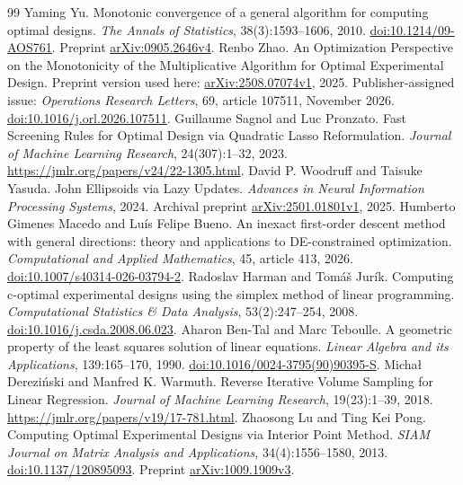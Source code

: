 \begin{thebibliography}{99}
 Yaming Yu. Monotonic convergence of a general algorithm for computing optimal designs. \emph{The Annals of Statistics}, 38(3):1593--1606, 2010. \href{https://doi.org/10.1214/09-AOS761}{doi:10.1214/09-AOS761}. Preprint \href{https://arxiv.org/abs/0905.2646v4}{arXiv:0905.2646v4}.
 Renbo Zhao. An Optimization Perspective on the Monotonicity of the Multiplicative Algorithm for Optimal Experimental Design. Preprint version used here: \href{https://arxiv.org/abs/2508.07074v1}{arXiv:2508.07074v1}, 2025. Publisher-assigned issue: \emph{Operations Research Letters}, 69, article 107511, November 2026. \href{https://doi.org/10.1016/j.orl.2026.107511}{doi:10.1016/j.orl.2026.107511}.
 Guillaume Sagnol and Luc Pronzato. Fast Screening Rules for Optimal Design via Quadratic Lasso Reformulation. \emph{Journal of Machine Learning Research}, 24(307):1--32, 2023. \url{https://jmlr.org/papers/v24/22-1305.html}.
 David P. Woodruff and Taisuke Yasuda. John Ellipsoids via Lazy Updates. \emph{Advances in Neural Information Processing Systems}, 2024. Archival preprint \href{https://arxiv.org/abs/2501.01801v1}{arXiv:2501.01801v1}, 2025.
 Humberto Gimenes Macedo and Lu\'is Felipe Bueno. An inexact first-order descent method with general directions: theory and applications to DE-constrained optimization. \emph{Computational and Applied Mathematics}, 45, article 413, 2026. \href{https://doi.org/10.1007/s40314-026-03794-2}{doi:10.1007/s40314-026-03794-2}.
 Radoslav Harman and Tom\'a\v{s} Jur\'ik. Computing c-optimal experimental designs using the simplex method of linear programming. \emph{Computational Statistics \& Data Analysis}, 53(2):247--254, 2008. \href{https://doi.org/10.1016/j.csda.2008.06.023}{doi:10.1016/j.csda.2008.06.023}.
 Aharon Ben-Tal and Marc Teboulle. A geometric property of the least squares solution of linear equations. \emph{Linear Algebra and its Applications}, 139:165--170, 1990. \href{https://doi.org/10.1016/0024-3795(90)90395-S}{doi:10.1016/0024-3795(90)90395-S}.
 Micha\l{} Derezi\'nski and Manfred K. Warmuth. Reverse Iterative Volume Sampling for Linear Regression. \emph{Journal of Machine Learning Research}, 19(23):1--39, 2018. \url{https://jmlr.org/papers/v19/17-781.html}.
 Zhaosong Lu and Ting Kei Pong. Computing Optimal Experimental Designs via Interior Point Method. \emph{SIAM Journal on Matrix Analysis and Applications}, 34(4):1556--1580, 2013. \href{https://doi.org/10.1137/120895093}{doi:10.1137/120895093}. Preprint \href{https://arxiv.org/abs/1009.1909v3}{arXiv:1009.1909v3}.

\end{thebibliography}
